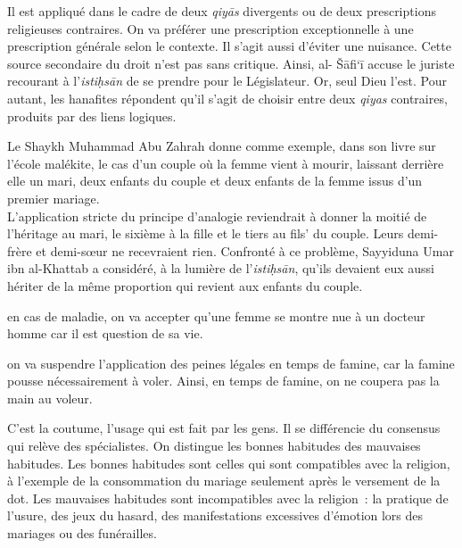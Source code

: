 Il est appliqué dans le cadre de deux \emph{qiyās} divergents ou de deux
prescriptions religieuses contraires. On va préférer une prescription
exceptionnelle à une prescription générale selon le contexte. Il s'agit
aussi d'éviter une nuisance. Cette source secondaire du droit n'est pas
sans critique. Ainsi, al- Šāfi`ī accuse le juriste recourant à
l'\emph{istiḥsān} de se prendre pour le Législateur. Or, seul Dieu
l'est. Pour autant, les hanafites répondent qu'il s'agit de choisir
entre deux \emph{qiyas} contraires, produits par des liens logiques.

\begin{Ex}
Le Shaykh Muhammad Abu Zahrah donne comme exemple, dans son
livre sur l'école malékite, le cas d'un couple où la femme vient à
mourir, laissant derrière elle un mari, deux enfants du couple et deux
enfants de la femme issus d'un premier mariage.\\
L'application stricte du principe d'analogie reviendrait à donner la
moitié de l'héritage au mari, le sixième à la fille et le tiers au fils'
du couple. Leurs demi-frère et demi-sœur ne recevraient rien. Confronté
à ce problème, Sayyiduna Umar ibn al-Khattab a considéré, à la lumière
de l'\emph{istiḥsān}, qu'ils devaient eux aussi hériter de la même
proportion qui revient aux enfants du couple.
\end{Ex}
\begin{Ex}
en cas de maladie, on va accepter qu'une femme se montre nue
à un docteur homme car il est question de sa vie.
\end{Ex}
\begin{Ex}
on va suspendre l'application des peines légales en temps de
famine, car la famine pousse nécessairement à voler. Ainsi, en temps de
famine, on ne coupera pas la main au voleur.
\end{Ex}



C'est la coutume, l'usage qui est fait par les gens. Il se différencie
du consensus qui relève des spécialistes. On distingue les bonnes
habitudes des mauvaises habitudes. Les bonnes habitudes sont celles qui
sont compatibles avec la religion, à l'exemple de la consommation du
mariage seulement après le versement de la dot. Les mauvaises habitudes
sont incompatibles avec la religion~: la pratique de l'usure, des jeux
du hasard, des manifestations excessives d'émotion lors des mariages ou
des funérailles.

